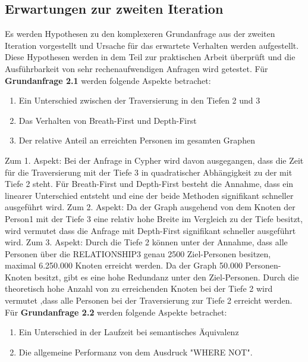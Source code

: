 \subsection{Erwartungen zur zweiten Iteration}
Es werden Hypothesen zu den komplexeren Grundanfrage aus der zweiten Iteration vorgestellt und Ursache für das erwartete Verhalten werden aufgestellt. Diese Hypothesen werden in dem Teil zur praktischen Arbeit überprüft und die Ausführbarkeit von sehr rechenaufwendigen Anfragen wird getestet.  \newline \newline
Für \textbf{Grundanfrage 2.1} werden folgende Aspekte betrachet: 
\begin{enumerate}
	\item Ein Unterschied zwischen der Traversierung in den Tiefen 2 und 3 
	\item Das Verhalten von Breath-First und Depth-First
	\item Der relative Anteil an erreichten Personen im gesamten Graphen
\end{enumerate}
Zum 1. Aspekt: Bei der Anfrage in Cypher wird davon ausgegangen, dass die Zeit für die Traversierung mit der Tiefe 3 in quadratischer Abhängigkeit zu der  mit Tiefe 2 steht. Für  Breath-First und Depth-First besteht die Annahme, dass ein linearer Unterschied entsteht  und eine der beide Methoden signifikant schneller ausgeführt wird. \newline
Zum 2. Aspekt: Da der Graph ausgehend von dem Knoten der Person1 mit der Tiefe 3 eine relativ hohe Breite im Vergleich zu der Tiefe besitzt, wird vermutet dass die Anfrage mit Depth-First signifikant schneller  ausgeführt wird. \newline
Zum 3. Aspekt: Durch die Tiefe 2 können  unter der Annahme, dass alle Personen über die RELATIONSHIP3 genau 2500 Ziel-Personen besitzen, maximal 6.250.000 Knoten erreicht werden. Da der Graph 50.000 Personen-Knoten besitzt, gibt es eine hohe Redundanz unter den Ziel-Personen. Durch die theoretisch hohe Anzahl von zu erreichenden Knoten bei der Tiefe 2 wird vermutet ,dass alle Personen bei der Traversierung zur Tiefe 2 erreicht werden. \newline \newline
Für \textbf{Grundanfrage 2.2} werden folgende Aspekte betrachet: 
\begin{enumerate}
	\item Ein Unterschied in der Laufzeit bei  semantisches Äquivalenz  
	\item Die allgemeine Performanz von dem Ausdruck "WHERE NOT".
\end{enumerate}
